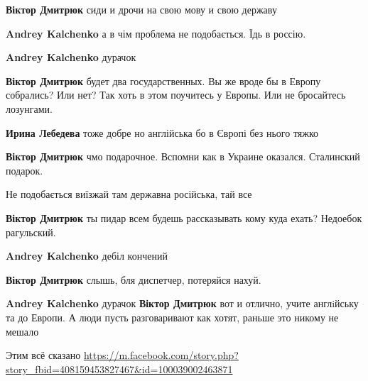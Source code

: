 \begin{itemize}
\begin{itemize}
\textbf{Віктор Дмитрюк} сиди и дрочи на свою мову и свою державу

\textbf{Andrey Kalchenko} а в чім проблема не подобається. Їдь в россію.

\textbf{Andrey Kalchenko} дурачок

\textbf{Віктор Дмитрюк} будет два государственных. Вы же вроде бы в Европу
собрались? Или нет? Так хоть в этом поучитесь у Европы. Или не бросайтесь
лозунгами.

\textbf{Ирина Лебедева} тоже добре но англійська бо в Європі без нього тяжко

\textbf{Віктор Дмитрюк} чмо подарочное. Вспомни как в Украине оказался. Сталинский подарок.

Не подобається виїзжай там державна російська, тай все

\textbf{Віктор Дмитрюк} ты пидар всем будешь рассказывать кому куда ехать? Недоебок рагульский.

\textbf{Andrey Kalchenko} дебіл кончений

\textbf{Віктор Дмитрюк} слышь, бля диспетчер, потеряйся нахуй.

\textbf{Andrey Kalchenko} дурачок
\textbf{Віктор Дмитрюк} вот и отлично, учите англiйську та до Европи. А люди
пусть разговаривают как хотят, раньше это никому не мешало
\end{itemize}

Этим всё сказано 
\url{https://m.facebook.com/story.php?story_fbid=408159453827467&id=100039002463871}


\end{itemize}
